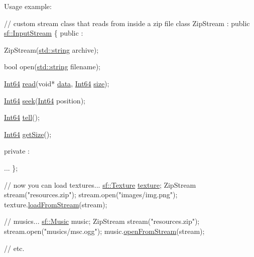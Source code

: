 Usage example\-: 
\begin{DoxyCode}
\textcolor{comment}{// custom stream class that reads from inside a zip file}
\textcolor{keyword}{class }ZipStream : \textcolor{keyword}{public} \hyperlink{classsf_1_1_input_stream}{sf::InputStream}
\{
\textcolor{keyword}{public} :

    ZipStream(\hyperlink{gl3_8h_ac83513893df92266f79a515488701770}{std::string} archive);

    \textcolor{keywordtype}{bool} open(\hyperlink{gl3_8h_ac83513893df92266f79a515488701770}{std::string} filename);

    \hyperlink{namespacesf_a2840579fed3494d9f330baf7a5a19903}{Int64} \hyperlink{classsf_1_1_input_stream_a8dd89c74c1acb693203f50e750c6ae53}{read}(\textcolor{keywordtype}{void}* \hyperlink{gl3_8h_a0f78eecb0891cce3bdfc815b971866a1}{data}, \hyperlink{namespacesf_a2840579fed3494d9f330baf7a5a19903}{Int64} \hyperlink{gl3_8h_a79ef9eb3e59c4bb34c4b9fbeb8d28ff7}{size});

    \hyperlink{namespacesf_a2840579fed3494d9f330baf7a5a19903}{Int64} \hyperlink{classsf_1_1_input_stream_a76aba8e5d5cf9b1c5902d5e04f7864fc}{seek}(\hyperlink{namespacesf_a2840579fed3494d9f330baf7a5a19903}{Int64} position);
    
    \hyperlink{namespacesf_a2840579fed3494d9f330baf7a5a19903}{Int64} \hyperlink{classsf_1_1_input_stream_a599515b9ccdbddb6fef5a98424fd559c}{tell}();

    \hyperlink{namespacesf_a2840579fed3494d9f330baf7a5a19903}{Int64} \hyperlink{classsf_1_1_input_stream_a311eaaaa65d636728e5153b574b72d5d}{getSize}();

\textcolor{keyword}{private} :

    ...
\};

\textcolor{comment}{// now you can load textures...}
\hyperlink{classsf_1_1_texture}{sf::Texture} \hyperlink{gl3_8h_ab21590c4736d1459a5a0674a42b5a655}{texture};
ZipStream stream(\textcolor{stringliteral}{"resources.zip"});
stream.open(\textcolor{stringliteral}{"images/img.png"});
texture.\hyperlink{classsf_1_1_texture_a6803a13465a7113a8964d1081841886d}{loadFromStream}(stream);

\textcolor{comment}{// musics...}
\hyperlink{classsf_1_1_music}{sf::Music} music;
ZipStream stream(\textcolor{stringliteral}{"resources.zip"});
stream.open(\textcolor{stringliteral}{"musics/msc.ogg"});
music.\hyperlink{classsf_1_1_music_a4e55d1910a26858b44778c26b237d673}{openFromStream}(stream);

\textcolor{comment}{// etc.}
\end{DoxyCode}
 

